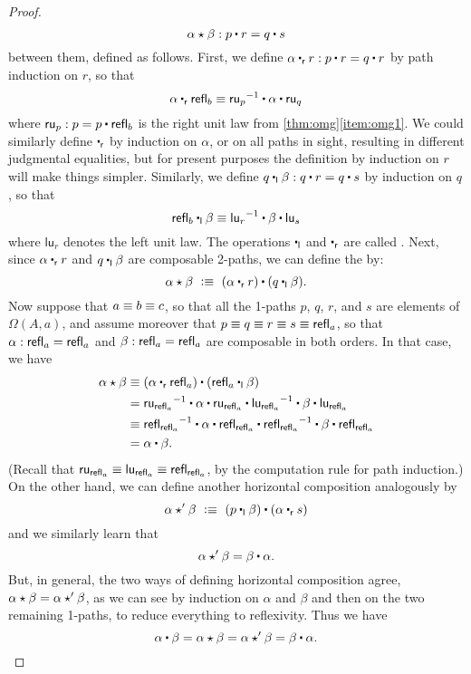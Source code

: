 \begin{proof}
\begin{equation*}
\alpha\hct\beta : p\ct r = q\ct s
\end{equation*}
%
between them, defined as follows. First, we define $\alpha \rightwhisker r : p\ct r = q\ct r$ by path induction on $r$, so that \[ \alpha \rightwhisker \refl{b} \jdeq \opp{\mathsf{ru}_p} \ct \alpha \ct \mathsf{ru}_q \]
where $\mathsf{ru}_p : p = p \ct \refl{b}$ is the right unit law from \cref{thm:omg}\ref{item:omg1}. We could similarly define $\rightwhisker$ by induction on $\alpha$, or on all paths in sight, resulting in different judgmental equalities, but for present purposes the definition by induction on $r$ will make things simpler. Similarly, we define $q\leftwhisker \beta : q\ct r = q\ct s$ by induction on $q$, so that \[ \refl{b} \leftwhisker \beta \jdeq \opp{\mathsf{lu}_r} \ct \beta \ct \mathsf{lu}_s \]
where $\mathsf{lu}_r$ denotes the left unit law. The operations $\leftwhisker$ and $\rightwhisker$ are called . Next, since $\alpha \rightwhisker r$ and $q\leftwhisker \beta$ are composable 2-paths, we can define the  %
%
by: \[
\alpha\hct\beta\ \defeq\ (\alpha\rightwhisker r) \ct (q\leftwhisker \beta).
\]
Now suppose that $a \equiv b \equiv c$, so that all the 1-paths $p$, $q$, $r$, and $s$ are elements of $\Omega(A,a)$, and assume moreover that $p\equiv q \equiv r \equiv s\equiv \mathsf{refl}_{a}$, so that $\alpha:\mathsf{refl}_{a} = \mathsf{refl}_{a}$ and $\beta:\mathsf{refl}_{a} = \mathsf{refl}_{a}$ are composable in both orders. In that case, we have \begin{align*}
\alpha\hct\beta
&\jdeq (\alpha\rightwhisker\refl{a}) \ct (\refl{a}\leftwhisker \beta)\\
&= \opp{\mathsf{ru}_{\refl{a}}} \ct \alpha \ct \mathsf{ru}_{\refl{a}} \ct \opp{\mathsf{lu}_{\refl a}} \ct \beta \ct \mathsf{lu}_{\refl{a}}\\
&\jdeq \opp{\refl{\refl{a}}} \ct \alpha \ct \refl{\refl{a}} \ct \opp{\refl{\refl a}} \ct \beta \ct \refl{\refl{a}}\\
&= \alpha \ct \beta.
\end{align*}
(Recall that $\mathsf{ru}_{\mathsf{refl}_{a}} \equiv \mathsf{lu}_{\mathsf{refl}_{a}} \equiv \mathsf{refl}_{\mathsf{refl}_{a}}$, by the computation rule for path induction.) On the other hand, we can define another horizontal composition analogously by \[
\alpha\hct'\beta\ \defeq\ (p\leftwhisker \beta)\ct (\alpha\rightwhisker s)
\]
and we similarly learn that \[
\alpha\hct'\beta = \beta\ct\alpha.
\]
%
But, in general, the two ways of defining horizontal composition agree, $\alpha\star\beta = \alpha\star'\beta$, as we can see by induction on $\alpha$ and $\beta$ and then on the two remaining 1-paths, to reduce everything to reflexivity. Thus we have \[\alpha \ct \beta = \alpha\hct\beta = \alpha\hct'\beta = \beta\ct\alpha.
\qedhere
\]
\end{proof}

